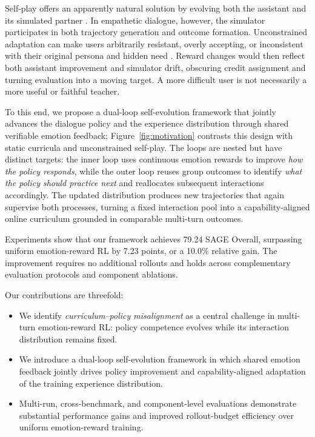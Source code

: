 \documentclass[letterpaper]{article}
\begin{document}
Self-play offers an apparently natural solution by evolving both the assistant and its simulated partner \cite{chen2024spin,sead2026}. In empathetic dialogue, however, the simulator participates in both trajectory generation and outcome formation. Unconstrained adaptation can make users arbitrarily resistant, overly accepting, or inconsistent with their original persona and hidden need \cite{yoon2024usersim,dou2025simulatorarena}. Reward changes would then reflect both assistant improvement and simulator drift, obscuring credit assignment and turning evaluation into a moving target. A more difficult user is not necessarily a more useful or faithful teacher.

To this end, we propose a dual-loop self-evolution framework that jointly advances the dialogue policy and the experience distribution through shared verifiable emotion feedback; Figure~\ref{fig:motivation} contrasts this design with static curricula and unconstrained self-play. The loops are nested but have distinct targets: the inner loop uses continuous emotion rewards to improve \emph{how the policy responds}, while the outer loop reuses group outcomes to identify \emph{what the policy should practice next} and reallocates subsequent interactions accordingly. The updated distribution produces new trajectories that again supervise both processes, turning a fixed interaction pool into a capability-aligned online curriculum grounded in comparable multi-turn outcomes.

Experiments show that our framework achieves 79.24 SAGE Overall, surpassing uniform emotion-reward RL by 7.23 points, or a 10.0\% relative gain. The improvement requires no additional rollouts and holds across complementary evaluation protocols and component ablations.

Our contributions are threefold:
\begin{itemize}
  \item We identify \emph{curriculum--policy misalignment} as a central challenge in multi-turn emotion-reward RL: policy competence evolves while its interaction distribution remains fixed.
  \item We introduce a dual-loop self-evolution framework in which shared emotion feedback jointly drives policy improvement and capability-aligned adaptation of the training experience distribution.
  \item Multi-run, cross-benchmark, and component-level evaluations demonstrate substantial performance gains and improved rollout-budget efficiency over uniform emotion-reward training.
\end{itemize}
\end{document}

